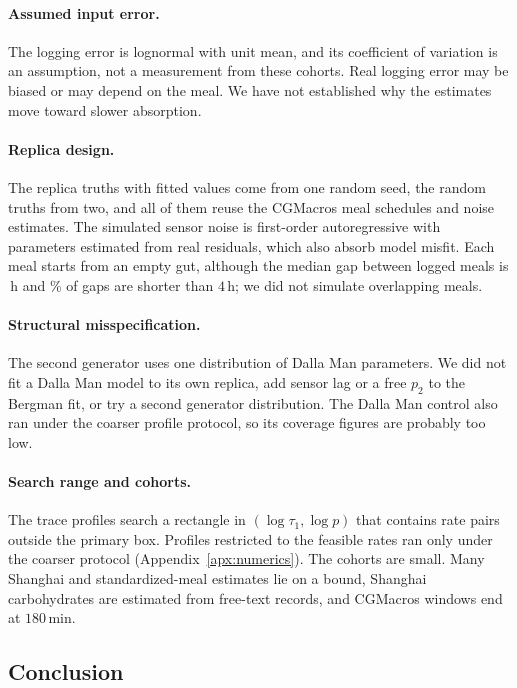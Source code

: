 \paragraph{Assumed input error.}
The logging error is lognormal with unit mean, and its coefficient of variation is an assumption, not a measurement from these cohorts.
Real logging error may be biased or may depend on the meal.
We have not established why the estimates move toward slower absorption.

\paragraph{Replica design.}
The replica truths with fitted values come from one random seed, the random truths from two, and all of them reuse the \resCRandZeroTauN{} CGMacros meal schedules and noise estimates.
The simulated sensor noise is first-order autoregressive with parameters estimated from real residuals, which also absorb model misfit.
Each meal starts from an empty gut, although the median gap between logged meals is \resOverlapMedianGap\,h and \resOverlapWithinFour\% of gaps are shorter than $4$\,h; we did not simulate overlapping meals.

\paragraph{Structural misspecification.}
The second generator uses one distribution of Dalla Man parameters.
We did not fit a Dalla Man model to its own replica, add sensor lag or a free $p_2$ to the Bergman fit, or try a second generator distribution.
The Dalla Man control also ran under the coarser profile protocol, so its coverage figures are probably too low.

\paragraph{Search range and cohorts.}
The trace profiles search a rectangle in $(\log\tau_1,\log p)$ that contains rate pairs outside the primary box.
Profiles restricted to the feasible rates ran only under the coarser protocol (Appendix~\ref{apx:numerics}).
The cohorts are small.
Many Shanghai and standardized-meal estimates lie on a bound, Shanghai carbohydrates are estimated from free-text records, and CGMacros windows end at $180$\,min.

\subsection{Conclusion}
\label{sec:conclusion}


